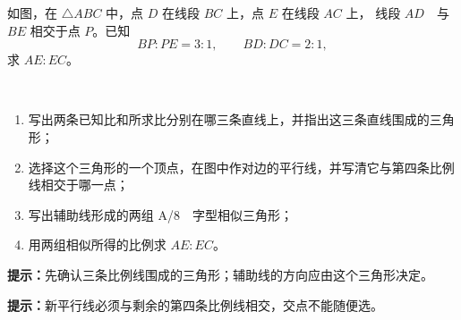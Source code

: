 \documentclass{exam-zh}
\begin{document}
\begin{problem}[points=10]
  \noindent
  \begin{minipage}[t]{\dimexpr\linewidth-60mm-6mm\relax}
    \vspace{0pt}
    如图，在 $\triangle ABC$ 中，点 $D$ 在线段 $BC$ 上，点 $E$ 在线段 $AC$ 上，
线段 $AD$\ \ 与 $BE$ 相交于点 $P$。已知
\[
BP:PE=3:1,\qquad BD:DC=2:1,
\]
求 $AE:EC$。

\ \begin{enumerate}[label=(\arabic*)]
  \item 写出两条已知比和所求比分别在哪三条直线上，并指出这三条直线围成的三角形；
\ \  \item 选择这个三角形的一个顶点，在图中作对边的平行线，并写清它与第四条比例线相交于哪一点；
  \item 写出辅助线形成的两组 A/8\ \ 字型相似三角形；
  \item 用两组相似所得的比例求 $AE:EC$。
\end{enumerate}

    \begin{hintbox}
\textbf{提示：}先确认三条比例线围成的三角形；辅助线的方向应由这个三角形决定。\end{hintbox}
\begin{hintbox}
\textbf{提示：}新平行线必须与剩余的第四条比例线相交，交点不能随便选。\end{hintbox}

  \end{minipage}\hfill
  \begin{diagramcoltikz}{60mm}{第 2 题原始构型，请在图上补作辅助线。}
  }
  \end{diagramcoltikz}
  \par\medskip
  \answerarea[68mm]
\end{problem}


\end{document}
